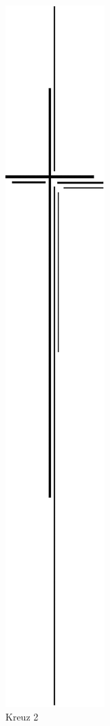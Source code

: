 \documentclass[ngerman,a4paper,11pt]{scrreprt}
\begin{document}
\begin{figure}[H]
\centering
\includegraphics[width=\textwidth,height=.8\textheight,keepaspectratio]{Bilder/Bilder/750_0010_12728_Kreuz_1.png}
\caption{\label{img_Kreuz_2}Kreuz 2}
\end{figure}
\end{document}
